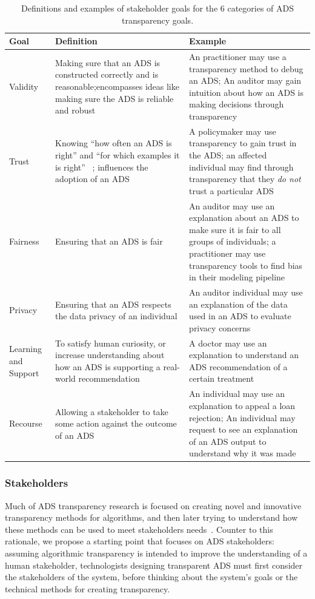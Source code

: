 \begin{table}[t]
\centering 
\begin{tabular}{p{}p{}p{}}
\toprule
\bf{Goal} & \bf{Definition} & \bf{Example} \\ \midrule
Validity & Making sure that an ADS is constructed correctly and is reasonable;encompasses ideas like making sure the ADS is reliable and robust ~\cite{doshi2017towards} & An practitioner may use a transparency method to debug an ADS; An auditor may gain intuition about how an ADS is making decisions through transparency \\
Trust & Knowing ``how often an ADS is right'' and ``for which examples it is right'' ~\cite{lipton2018mythos}; influences the adoption of an ADS ~\cite{rodolfa2020machine} & A policymaker may use transparency to gain trust in the ADS; an affected individual may find through transparency that they \emph{do not} trust a particular ADS~\cite{schmidt2020transparency} \\
Fairness & Ensuring that an ADS is fair & An auditor may use an explanation about an ADS to make sure it is fair to all groups of individuals; a practitioner may use transparency tools to find bias in their modeling pipeline \\
Privacy & Ensuring that an ADS respects the data privacy of an individual & An auditor individual may use an explanation of the data used in an ADS to evaluate privacy concerns \\ 
Learning and Support &To satisfy human curiosity, or increase understanding about how an ADS is supporting a real-world recommendation~\cite{rodolfa2020machine, molnar2019} & A doctor may use an explanation to understand an ADS recommendation of a certain treatment \\
Recourse & Allowing a stakeholder to take some action against the outcome of an ADS ~\cite{bhatt2020explainable, rodolfa2020machine} & An individual may use an explanation to appeal a loan rejection; An individual may request to see an explanation of an ADS output to understand why it was made \\
\bottomrule
\end{tabular}
\caption{Definitions and examples of stakeholder goals for the 6 categories of ADS transparency goals.}
\label{tab:goals}
\end{table}

\subsubsection{Stakeholders} Much of ADS transparency research is focused on creating novel and innovative transparency methods for algorithms, and then later trying to understand how these methods can be used to meet stakeholders needs~\cite{bhatt2020explainable, preece2018stakeholders}. Counter to this rationale, we propose a starting point that focuses on ADS stakeholders: assuming algorithmic transparency is intended to improve the understanding of a human stakeholder, technologists designing transparent ADS must first consider the stakeholders of the system, before thinking about the system's goals or the technical methods for creating transparency.

